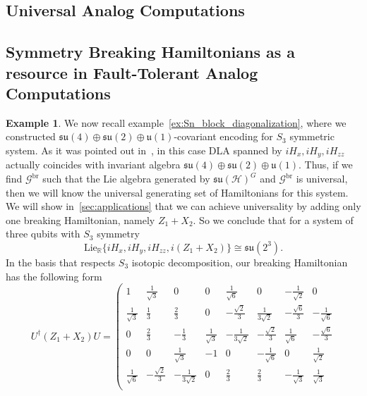 \documentclass[10pt,twocolumn,superscriptaddress,aps,amsmath,amssymb,citeautoscript,floatfix,prx]{revtex4-2}
\newcounter{alg}
\theoremstyle{plain}
\theoremstyle{plain}
\theoremstyle{plain}
\theoremstyle{plain}
\theoremstyle{plain}
\theoremstyle{plain}
\newcommand{\HH}{\mathcal{H}}
\theoremstyle{plain}
\theoremstyle{definition}
\newtheorem{smexample}[smtheorem]{Example}
\theoremstyle{plain}
\begin{document}
\begin{appendix}
\section{Universal Analog Computations}\label{sec:supple_Universal_comp}

\subsection{Symmetry Breaking Hamiltonians as a resource in Fault-Tolerant Analog Computations}

\begin{smexample}\label{ex:s3_breaking_not_block_diagonal}
We now recall example~\ref{ex:Sn_block_diagonalization}, where we constructed $\mathfrak{su}(4)\oplus\mathfrak{su}(2)\oplus\mathfrak{u}(1)$-covariant encoding for $S_3$ symmetric system.
As it was pointed out in~\cite{Albertini2018}, in this case DLA spanned by $iH_x, iH_y, iH_{zz}$ actually coincides with invariant algebra
$\mathfrak{su}(4)\oplus\mathfrak{su}(2)\oplus \mathfrak{u}(1)$. Thus, if we find 
$\mathcal{G}^{\text{br}}$ such that the Lie algebra generated by $\mathfrak{su}(\HH)^G$ and $\mathcal{G}^{\text{br}}$ is universal, then 
we will know the universal generating set of Hamiltonians for this system. We will show in~\ref{sec:applications} that we can achieve universality by adding only one breaking Hamiltonian, namely $Z_1+X_2$.
So we conclude that for a system of three qubits with $S_3$ symmetry
\[
    \mathrm{Lie}_{\mathbb{R}}\{iH_x, iH_y, iH_{zz}, i(Z_1+X_2)\}\cong \mathfrak{su}(2^3).
\]
In the basis that respects $S_3$ isotopic decomposition, our breaking Hamiltonian has the following form
\[
    U^{\dagger}\left(Z_1+X_2\right) U=\left(\begin{array}{cccccccc}
    1 & \frac{1}{\sqrt{3}} & 0 & 0 & \frac{1}{\sqrt{6}} & 0 & -\frac{1}{\sqrt{2}} & 0 \\
    \frac{1}{\sqrt{3}} & \frac{1}{3} & \frac{2}{3} & 0 & -\frac{\sqrt{2}}{3} & \frac{1}{3 \sqrt{2}} & -\frac{\sqrt{6}}{3} & -\frac{1}{\sqrt{6}} \\
    0 & \frac{2}{3} & -\frac{1}{3} & \frac{1}{\sqrt{3}} & -\frac{1}{3 \sqrt{2}} & -\frac{\sqrt{2}}{3} & \frac{1}{\sqrt{6}} & -\frac{\sqrt{6}}{3} \\
    0 & 0 & \frac{1}{\sqrt{3}} & -1 & 0 & -\frac{1}{\sqrt{6}} & 0 & \frac{1}{\sqrt{2}} \\
    \frac{1}{\sqrt{6}} & -\frac{\sqrt{2}}{3} & -\frac{1}{3 \sqrt{2}} & 0 & \frac{2}{3} & \frac{2}{3} & -\frac{1}{\sqrt{3}} & \frac{1}{\sqrt{3}} \\

\end{array}\]
\end{smexample}
\end{appendix}
\end{document}
